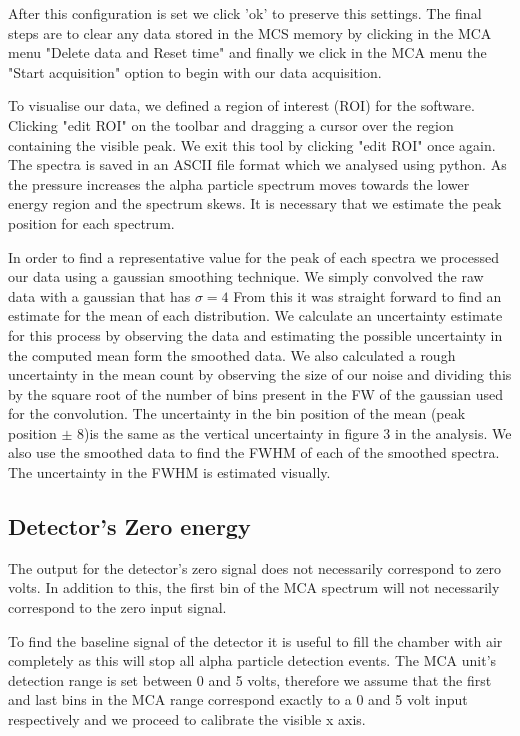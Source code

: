 \documentclass[a4paper]{article}
\begin{document}
\begin{multicols}{2}
After this configuration is set we click 'ok' to preserve this settings.
The final steps are to clear any data stored in the MCS memory by clicking in the MCA menu "Delete data and Reset time" and finally we 
click in the MCA menu the "Start acquisition" option to begin with our data acquisition.

To visualise our data, we defined a region of interest (ROI) for the software. Clicking "edit ROI" on the toolbar and dragging a cursor over the region containing the visible peak. We exit this tool by clicking "edit ROI" once again. The spectra is saved in an ASCII file format which we analysed using python.
As the pressure increases the alpha particle spectrum moves towards the lower energy region and the spectrum skews. It is necessary that we estimate the peak position for each spectrum.

In order to find a representative value for the peak of each spectra we processed our data using a gaussian smoothing technique. We simply convolved the raw data with a gaussian that has $\sigma = 4$ From this it was straight forward to find an estimate for the mean of each distribution.
We calculate an uncertainty estimate for this process by observing the data and estimating the possible uncertainty in the computed mean form the smoothed data. We also calculated a rough uncertainty in the  mean count by observing the size of our noise and dividing this by the square root of the number of bins present in the FW of the gaussian used for the convolution.
The uncertainty in the bin position of the mean (peak position $\pm$ 8)is the same as the vertical uncertainty in figure 3 in the analysis.
We also use the smoothed data to find the FWHM of each of the smoothed spectra. The uncertainty in the FWHM is estimated visually.

\subsection{Detector's Zero energy}
The output for the detector's zero signal does not necessarily correspond to zero volts. In addition to this, the first bin of the MCA spectrum will not necessarily correspond to the zero input signal\cite{SPA}.

To find the baseline signal of the detector it is useful to fill  the  chamber  with  air  completely as this will  stop  all  alpha  particle detection events\cite{SPA}.
The  MCA  unit’s detection range is set between 0 and 5 volts, therefore we assume that the first and last bins in the MCA range correspond exactly to a 0 and 5 volt input respectively and we proceed to calibrate the visible x axis. 


\end{multicols}
\end{document}
